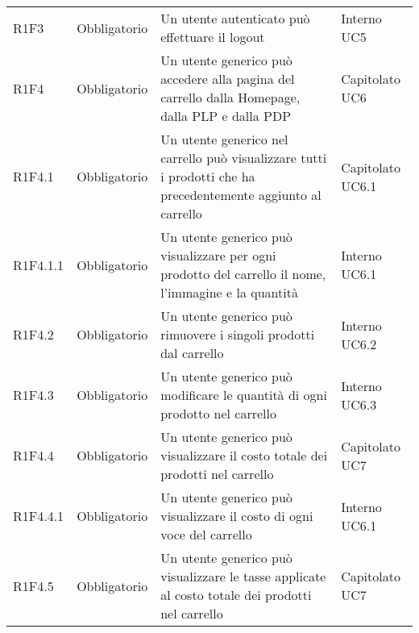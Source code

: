 {\begin{longtable}{C{2.5cm} C{2.8cm} C{6.7cm} C{2.5cm}}

R1F3 & Obbligatorio & Un utente autenticato può effettuare il logout & Interno \newline UC5 \\


R1F4 & Obbligatorio & Un utente generico può accedere alla pagina del carrello dalla Homepage, dalla PLP e dalla PDP & Capitolato \newline UC6 \\
R1F4.1 & Obbligatorio & Un utente generico nel carrello può visualizzare tutti i prodotti che ha precedentemente aggiunto al carrello & Capitolato \newline UC6.1 \\
R1F4.1.1 & Obbligatorio & Un utente generico può visualizzare per ogni prodotto del carrello il nome, l'immagine e la quantità & Interno \newline UC6.1 \\
R1F4.2 & Obbligatorio & Un utente generico può rimuovere i singoli prodotti dal carrello & Interno \newline UC6.2 \\
R1F4.3 & Obbligatorio & Un utente generico può modificare le quantità di ogni prodotto nel carrello & Interno \newline UC6.3\\
R1F4.4 & Obbligatorio & Un utente generico può visualizzare il costo totale dei prodotti nel carrello & Capitolato \newline UC7\\
R1F4.4.1 & Obbligatorio & Un utente generico può visualizzare il costo di ogni voce del carrello & Interno \newline UC6.1\\
R1F4.5 & Obbligatorio & Un utente generico può visualizzare le tasse applicate al costo totale dei prodotti nel carrello & Capitolato \newline UC7\\



\end{longtable}}
